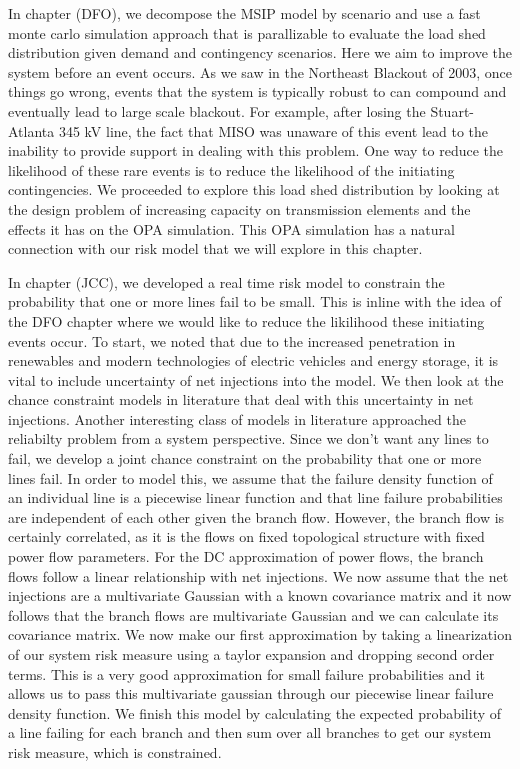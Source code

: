 In chapter (DFO), we decompose the MSIP model by scenario and use a fast monte carlo simulation approach that is parallizable to evaluate the load shed distribution given demand and contingency scenarios.  Here we aim to improve the system before an event occurs.  As we saw in the Northeast Blackout of 2003, once things go wrong, events that the system is typically robust to can compound and eventually lead to large scale blackout.  For example, after losing the Stuart-Atlanta 345 kV line, the fact that MISO was unaware of this event lead to the inability to provide support in dealing with this problem.  One way to reduce the likelihood of these rare events is to reduce the likelihood of the initiating contingencies.  We proceeded to explore this load shed distribution by looking at the design problem of increasing capacity on transmission elements and the effects it has on the OPA simulation.  This OPA simulation has a natural connection with our risk model that we will explore in this chapter.

In chapter (JCC), we developed a real time risk model to constrain the probability that one or more lines fail to be small.  This is inline with the idea of the DFO chapter where we would like to reduce the likilihood these initiating events occur.  To start, we noted that due to the increased penetration in renewables and modern technologies of electric vehicles and energy storage, it is vital to include uncertainty of net injections into the model.  We then look at the chance constraint models in literature that deal with this uncertainty in net injections.  Another interesting class of models in literature approached the reliabilty problem from a system perspective.  Since we don't want any lines to fail, we develop a joint chance constraint on the probability that one or more lines fail.  In order to model this, we assume that the failure density function of an individual line is a piecewise linear function and that line failure probabilities are independent of each other given the branch flow.  However, the branch flow is certainly correlated, as it is the flows on fixed topological structure with fixed power flow parameters.  For the DC approximation of power flows, the branch flows follow a linear relationship with net injections.  We now assume that the net injections are a multivariate Gaussian with a known covariance matrix and it now follows that the branch flows are multivariate Gaussian and we can calculate its covariance matrix.  We now make our first approximation by taking a linearization of our system risk measure using a taylor expansion and dropping second order terms.  This is a very good approximation for small failure probabilities and it allows us to pass this multivariate gaussian through our piecewise linear failure density function.  We finish this model by calculating the expected probability of a line failing for each branch and then sum over all branches to get our system risk measure, which is constrained.


